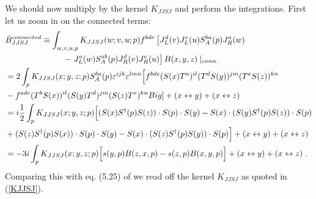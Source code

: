 \documentclass[11pt,a4paper]{article}
\begin{document}
We should now multiply by the kernel $K_{JJSJ}$ and perform the integrations. First let us zoom in on the connected terms:
\begin{equation}\begin{split}
&\dot B_{JJSJ}^{connected}\equiv\int_{w,v,u,p}K_{JJSJ}(w;v,u;p)f^{bde}\left[J_{L}^{d}(v)J_{L}^{e}(u)S_{A}^{ba}(p)J_{R}^{a}(w)\right. \\
&\left. \ \ \ \ \ \ \ \ \ \ \ \ \ \ \ \ \ \ \ \ \ -\ J_{L}^{a}(w)S_{A}^{ab}(p)J_{R}^{d}(v)J_{R}^{e}(u)\right]B(x,y,z)\mid_{conn.}\\
&=2\int_{p}K_{JJSJ}(x;y,z;p) S_{A}^{ba}(p)\varepsilon^{ijk}\varepsilon^{lmn}\Big[f^{bde}(S(x)T^{a})^{il}(T^{d}S(y))^{jm}(T^{e}S(z))^{kn}\\
&-f^{ade}(T^{b}S(x))^{il}(S(y)T^{d})^{jm}(S(z)T^{e})^{kn}Big]+\left(x\leftrightarrow y\right)+\left(x\leftrightarrow z\right)\\
&=i {1\over 2} \int_{p}K_{JJSJ}(x;y,z;p)\Big[(S(x)S^{\dagger}(p)S(z))\cdot S(p)\cdot S(y)-S(x)\cdot(S(y)S^{\dagger}(p)S(z))\cdot S(p) \\
&+(S(z)S^{\dagger}(p)S(x))\cdot S(p)\cdot S(y)-S(x)\cdot(S(z)S^{\dagger}(p)S(y))\cdot S(p)
\Big]+\left(x\leftrightarrow y\right)+\left(x\leftrightarrow z\right)\\
&={-3i} \int_{p}K_{JJSJ}(x;y,z;p)\Big[s(y,p)B(z,x,p)-s(z,p)B(x,y,p)\Big]+\left(x\leftrightarrow y\right)+\left(x\leftrightarrow z\right)\,.
 \end{split}\end{equation}
Comparing this with eq. (5.25) of \cite{Grab} we read off the kernel $K_{JJSJ}$ as quoted in (\ref{KJJSJ}).
\end{document}
